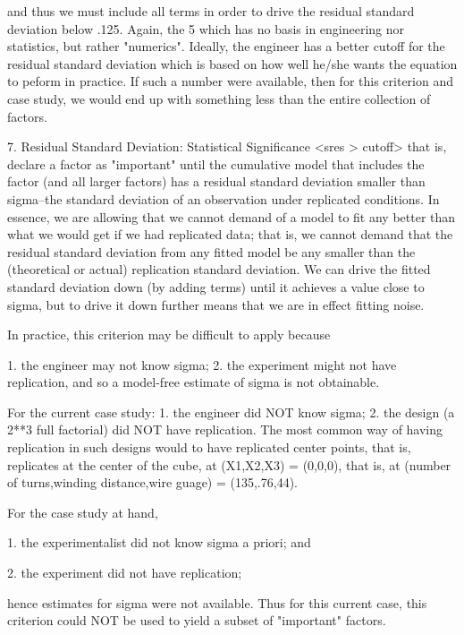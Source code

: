    and thus we must include all terms in order to
   drive the residual standard deviation below
   .125.  Again, the 5%
   which has no basis in engineering nor
   statistics, but rather "numerics".  Ideally,
   the engineer has a better cutoff for the
   residual standard deviation which is based on
   how well he/she wants the equation to peform in
   practice.  If such a number were available,
   then for this criterion and case study, we
   would end up with something less than the
   entire collection of factors.

7. Residual Standard Deviation: Statistical Significance
   <sres > cutoff>
   that is, declare a factor as "important" until
   the cumulative model that includes the factor
   (and all larger factors) has a residual
   standard deviation smaller than sigma--the
   standard deviation of an observation under
   replicated conditions.  In essence, we are
   allowing that we cannot demand of a model to
   fit any better than what we would get if we had
   replicated data; that is, we cannot demand that
   the residual standard deviation from any fitted
   model be any smaller than the (theoretical or
   actual) replication standard deviation.  We can
   drive the fitted standard deviation down (by
   adding terms) until it achieves a value close
   to sigma, but to drive it down further means
   that we are in effect fitting noise.

   In practice, this criterion may be difficult to apply because

      1. the engineer may not know sigma;
      2. the experiment might not have
         replication, and so a model-free estimate
         of sigma is not obtainable.

   For the current case study:
      1. the engineer did NOT know sigma;
      2. the design (a 2**3 full factorial) did
         NOT have replication.  The most common
         way of having replication in such designs
         would to have replicated center points,
         that is, replicates at the center of the
         cube, at (X1,X2,X3) = (0,0,0), that is,
         at (number of turns,winding distance,wire
         guage) = (135,.76,44).

   For the case study at hand,

      1. the experimentalist did not know sigma a
         priori; and

      2. the experiment did not have replication;

   hence estimates for sigma were not available.
   Thus for this current case, this criterion
   could NOT be used to yield a subset of
   "important" factors.


